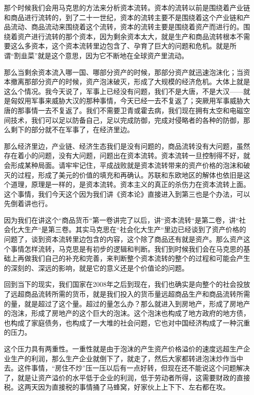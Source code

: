 \documentclass[UTF8, 12pt, a4paper]{ctexrep}
\begin{document}
那个时候我们会用马克思的方法来分析资本流转。资本的流转以前是围绕着产业链和商品进行流转的，到了二十一世纪，资本的流转主要不是围绕着这个产业链和产品流动、商品流动来围绕着这个流转，资本的流转主要是围绕着资产而进行的。围绕着资产进行流转的那个资本，因为剩余资本太大，就是生产和商品流转根本不需要这么多资本，这个资本流转里边包含了、孕育了巨大的问题和危机。就是所谓“割韭菜”就是这个意思，因为它不断地在全球资产里流动。

那么当剩余资本流入哪一国、哪部分资产的时候，那部分资产就迅速泡沫化；当资本撤离那部分资产的时候，资产泡沫破灭，形成了大规模的经济危机。大体上就是这么个情况。我今天说了，军事上已经没有问题，我们不是大唐，不是大汉——就是匈奴用军事来威胁大汉的那种事情，今天已经一去不复返了；突厥用军事威胁大唐的那事情一去不复返了。我们不需要卫青或霍去病，我们现在拥有太空和电磁空间技术，我们可以足以防备自己，足以完成防御，完成对侵略者的各种的防御，那么剩下的部分就不在军事了，在经济里边。

那么经济里边，产业链、经济生态我们是没有问题的，商品流转没有大问题，虽然存在着小的问题，没有大问题，问题出在资本流转。资本流转一旦控制得不好，就会形成某种局面。请牢牢记住，平成战败就是资本流转带来的资产价格的泡沫和破灭的过程，形成了美元的价值的填充和再确认。苏联和东欧地区的解体也依旧是这个道理，原理是一样的，是资本流转。资本主义的真正的杀伤力在资本流转上面。这个事情，我们今天这个因为我们讲《资本论》直接进入到第三也是个办法，可以先倒着讲也行。

因为我们在讲这个“商品货币“第一卷讲完了以后，讲“资本流转“是第二卷，讲“社会化大生产“是第三卷。其实马克思在“社会化大生产“里边已经谈到了资产价格的问题了，谈到资本流转里边包含的内容，这个除了商品还有就是资产。那么资产这个事情怎样流转，马克思是有初步的逻辑和判断。我们到时候我们会在马克思的基础上再做我们自己的补充和完善，来判断整个资本流转的整个的过程和可能会产生的深刻的、深远的影响，就是它的意义还是个价值论的问题。

回到当下的现实，我们国家在2008年之后到现在，我们也确实是向整个的社会投放了远超商品流转所需的货币，就是我们投入的货币量远超商品生产和商品流转所需的量，就是超过了这个量。超过的量怎么办？那么就进入到房地产，形成了房地产的泡沫，形成了房地产的这个巨大的泡沫。这个泡沫也构成了地方政府的地方债，也构成了家庭债务，也构成了一大堆的社会问题，它也对中国经济构成了一种沉重的压力。

这个压力具有两重性。一重性就是由于泡沫的产生资产价格溢价的速度远超生产企业生产的利润，那么生产企业就倒下了，就走了，然后大家都转进泡沫炒作当中去。这件事情，“房住不炒”压一压以后有一点好转，但现在还不能说这个问题解决了，就是让资产溢价的水平低于企业的利润，低于劳动者所得，这需要财政的直接税。这两天因为直接税的事情捅了马蜂窝，好家伙上上下下、左右都在攻。
\end{document}

